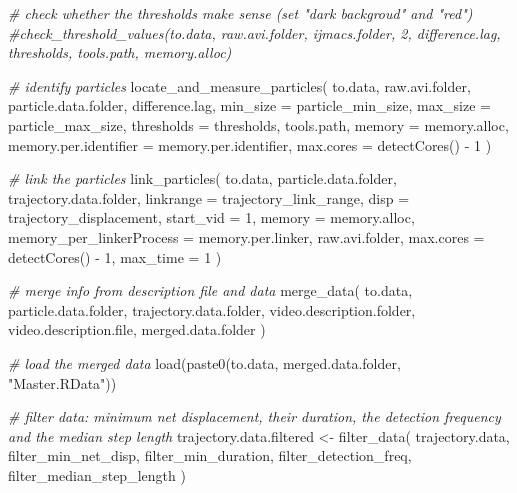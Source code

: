 \documentclass[
]{article}
\newenvironment{Shaded}{\begin{snugshade}}{\end{snugshade}}
\newcommand{\AttributeTok}[1]{\textcolor[rgb]{0.77,0.63,0.00}{#1}}
\newcommand{\CommentTok}[1]{\textcolor[rgb]{0.56,0.35,0.01}{\textit{#1}}}
\newcommand{\DecValTok}[1]{\textcolor[rgb]{0.00,0.00,0.81}{#1}}
\newcommand{\FunctionTok}[1]{\textcolor[rgb]{0.00,0.00,0.00}{#1}}
\newcommand{\NormalTok}[1]{#1}
\newcommand{\OtherTok}[1]{\textcolor[rgb]{0.56,0.35,0.01}{#1}}
\newcommand{\SpecialCharTok}[1]{\textcolor[rgb]{0.00,0.00,0.00}{#1}}
\newcommand{\StringTok}[1]{\textcolor[rgb]{0.31,0.60,0.02}{#1}}
\begin{document}
\begin{Shaded}
\begin{Highlighting}[]
\CommentTok{\# check whether the thresholds make sense (set "dark backgroud" and "red")}
\CommentTok{\#check\_threshold\_values(to.data, raw.avi.folder, ijmacs.folder, 2, difference.lag, thresholds, tools.path,  memory.alloc)}

\CommentTok{\# identify particles}
\FunctionTok{locate\_and\_measure\_particles}\NormalTok{(}
\NormalTok{  to.data,}
\NormalTok{  raw.avi.folder,}
\NormalTok{  particle.data.folder,}
\NormalTok{  difference.lag,}
  \AttributeTok{min\_size =}\NormalTok{ particle\_min\_size,}
  \AttributeTok{max\_size =}\NormalTok{ particle\_max\_size,}
  \AttributeTok{thresholds =}\NormalTok{ thresholds,}
\NormalTok{  tools.path,}
  \AttributeTok{memory =}\NormalTok{ memory.alloc,}
  \AttributeTok{memory.per.identifier =}\NormalTok{ memory.per.identifier,}
  \AttributeTok{max.cores =} \FunctionTok{detectCores}\NormalTok{() }\SpecialCharTok{{-}} \DecValTok{1}
\NormalTok{)}

\CommentTok{\# link the particles}
\FunctionTok{link\_particles}\NormalTok{(}
\NormalTok{  to.data,}
\NormalTok{  particle.data.folder,}
\NormalTok{  trajectory.data.folder,}
  \AttributeTok{linkrange =}\NormalTok{ trajectory\_link\_range,}
  \AttributeTok{disp =}\NormalTok{ trajectory\_displacement,}
  \AttributeTok{start\_vid =} \DecValTok{1}\NormalTok{,}
  \AttributeTok{memory =}\NormalTok{ memory.alloc,}
  \AttributeTok{memory\_per\_linkerProcess =}\NormalTok{ memory.per.linker,}
\NormalTok{  raw.avi.folder,}
  \AttributeTok{max.cores =} \FunctionTok{detectCores}\NormalTok{() }\SpecialCharTok{{-}} \DecValTok{1}\NormalTok{,}
  \AttributeTok{max\_time =} \DecValTok{1}
\NormalTok{)}

\CommentTok{\# merge info from description file and data}
\FunctionTok{merge\_data}\NormalTok{(}
\NormalTok{  to.data,}
\NormalTok{  particle.data.folder,}
\NormalTok{  trajectory.data.folder,}
\NormalTok{  video.description.folder,}
\NormalTok{  video.description.file,}
\NormalTok{  merged.data.folder}
\NormalTok{)}

\CommentTok{\# load the merged data}
\FunctionTok{load}\NormalTok{(}\FunctionTok{paste0}\NormalTok{(to.data, merged.data.folder, }\StringTok{"Master.RData"}\NormalTok{))}

\CommentTok{\# filter data: minimum net displacement, their duration, the detection frequency and the median step length}
\NormalTok{trajectory.data.filtered }\OtherTok{\textless{}{-}}
  \FunctionTok{filter\_data}\NormalTok{(}
\NormalTok{    trajectory.data,}
\NormalTok{    filter\_min\_net\_disp,}
\NormalTok{    filter\_min\_duration,}
\NormalTok{    filter\_detection\_freq,}
\NormalTok{    filter\_median\_step\_length}
\NormalTok{  )}


\end{Highlighting}
\end{Shaded}
\end{document}
